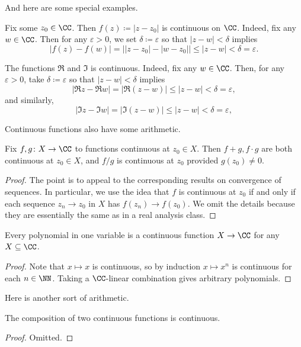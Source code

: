 \documentclass[../notes.tex]{subfiles}
\begin{document}
And here are some special examples.
\begin{example}
	Fix some $z_0\in\CC$. Then $f(z)\coloneqq |z-z_0|$ is continuous on $\CC$. Indeed, fix any $w\in\CC$. Then for any $\varepsilon>0$, we set $\delta\coloneqq \varepsilon$ so that $|z-w|<\delta$ implies
	\[|f(z)-f(w)|=\big||z-z_0|-|w-z_0|\big|\le|z-w|<\delta=\varepsilon.\]
\end{example}
\begin{example}
	The functions $\Re$ and $\Im$ is continuous. Indeed, fix any $w\in\CC$. Then, for any $\varepsilon>0$, take $\delta\coloneqq \varepsilon$ so that $|z-w|<\delta$ implies
	\[|\Re z-\Re w|=|\Re(z-w)|\le|z-w|<\delta=\varepsilon,\]
	and similarly,
	\[|\Im z-\Im w|=|\Im(z-w)|\le|z-w|<\delta=\varepsilon,\]
\end{example}
Continuous functions also have some arithmetic.
\begin{proposition} \label{prop:combinecontfuncs}
	Fix $f,g\colon X\to\CC$ to functions continuous at $z_0\in X$. Then $f+g,f\cdot g$ are both continuous at $z_0\in X$, and $f/g$ is continuous at $z_0$ provided $g(z_0)\ne0$.
\end{proposition}
\begin{proof}
	The point is to appeal to the corresponding results on convergence of sequences. In particular, we use the idea that $f$ is continuous at $z_0$ if and only if each sequence $z_n\to z_0$ in $X$ has $f(z_n)\to f(z_0)$. We omit the details because they are essentially the same as in a real analysis class.
\end{proof}
\begin{cor}
	Every polynomial in one variable is a continuous function $X\to\CC$ for any $X\subseteq\CC$.
\end{cor}
\begin{proof}
	Note that $x\mapsto x$ is continuous, so by induction $x\mapsto x^n$ is continuous for each $n\in\NN$. Taking a $\CC$-linear combination gives arbitrary polynomials.
\end{proof}
Here is another sort of arithmetic.
\begin{lemma}
	The composition of two continuous functions is continuous.
\end{lemma}
\begin{proof}
	Omitted.
\end{proof}
\end{document}
